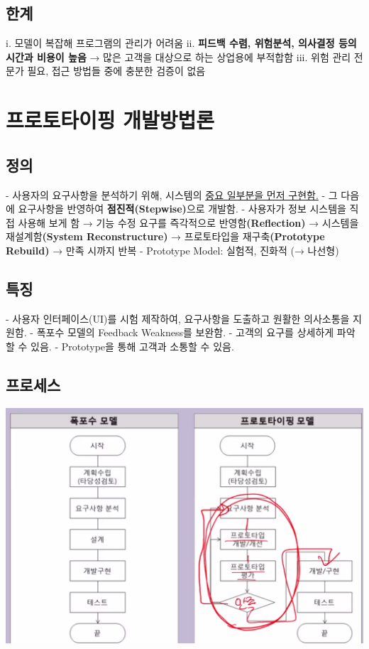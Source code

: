 \documentclass[a4paper,12pt]{article}
\begin{document}
\subsection{한계}
i. 모델이 복잡해 프로그램의 관리가 어려움
\newline
ii. \textbf{피드백 수렴, 위험분석, 의사결정 등의 시간과 비용이 높음} → 많은 고객을 대상으로 하는 상업용에 부적합함
\newline
iii. 위험 관리 전문가 필요, 접근 방법들 중에 충분한 검증이 없음


\newpage
\section{프로토타이핑 개발방법론}

\subsection{정의}
- 사용자의 요구사항을 분석하기 위해, 시스템의 \underline{중요 일부분을 먼저 구현함.}
\newline
- 그 다음에 요구사항을 반영하여 \textbf{점진적(Stepwise)}으로 개발함.
\newline
- 사용자가 정보 시스템을 직접 사용해 보게 함 → 기능 수정 요구를 즉각적으로 반영함\textbf{(Reflection)} → 시스템을 재설계함\textbf{(System Reconstructure)} → 프로토타입을 재구축\textbf{(Prototype Rebuild)} → 만족 시까지 반복
\newline
- Prototype Model: 실험적, 진화적 (→ 나선형)
\newline


\subsection{특징}
- 사용자 인터페이스(UI)를 시험 제작하여, 요구사항을 도출하고 원활한 의사소통을 지원함.
\newline
- 폭포수 모델의 Feedback Weakness를 보완함.
\newline
- 고객의 요구를 상세하게 파악할 수 있음.
\newline
- Prototype을 통해 고객과 소통할 수 있음.

\subsection{프로세스}

\includegraphics[scale=0.5]{41}
\newline
\end{document}
